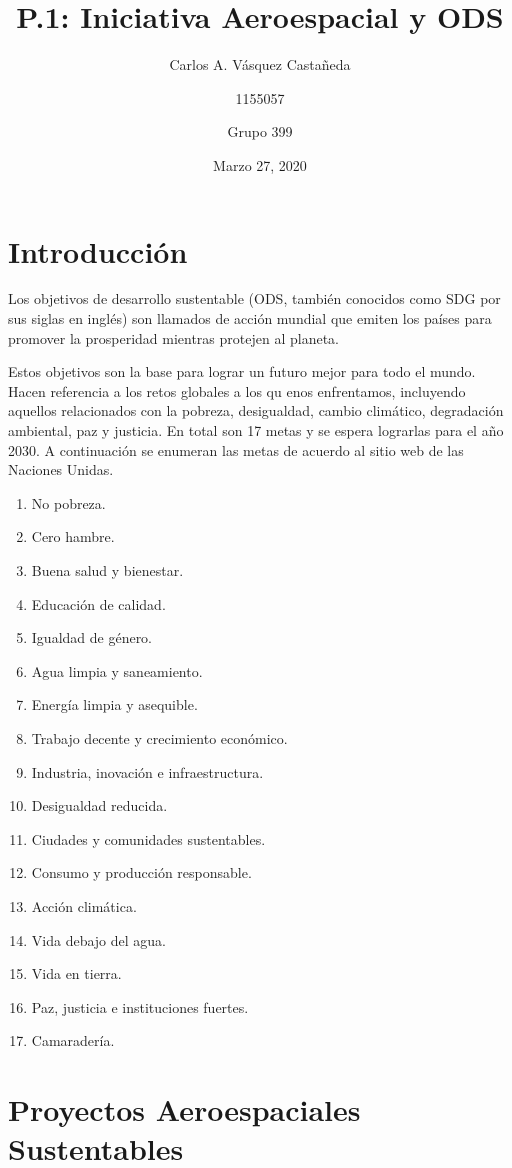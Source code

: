 \documentclass[12pt, letterpaper]{article}
\title{P.1: Iniciativa Aeroespacial y ODS}
\author{Carlos A. Vásquez Castañeda \and 1155057 \and Grupo 399}
\date{Marzo 27, 2020}
\begin{document}
\maketitle
\section*{Introducción}

Los objetivos de desarrollo sustentable (ODS, también conocidos como SDG por sus siglas en inglés) son llamados de acción mundial que emiten los países para promover la prosperidad mientras protejen al planeta. \parencite{un2020}

Estos objetivos son la base para lograr un futuro mejor para todo el mundo. Hacen referencia a los retos globales a los qu enos enfrentamos, incluyendo aquellos relacionados con la pobreza, desigualdad, cambio climático, degradación ambiental, paz y justicia. En total son 17 metas y se espera lograrlas para el año 2030. A continuación se enumeran las metas de acuerdo al sitio web de las Naciones Unidas.

\begin{enumerate}
	\item No pobreza.
	\item Cero hambre.
	\item Buena salud y bienestar.
	\item Educación de calidad.
	\item Igualdad de género.
	\item Agua limpia y saneamiento.
	\item Energía limpia y asequible.
	\item Trabajo decente y crecimiento económico.
	\item Industria, inovación e infraestructura.
	\item Desigualdad reducida.
	\item Ciudades y comunidades sustentables.
	\item Consumo y producción responsable.
	\item Acción climática.
	\item Vida debajo del agua.
	\item Vida en tierra.
	\item Paz, justicia e instituciones fuertes.
	\item Camaradería.
\end{enumerate}

\section*{Proyectos Aeroespaciales Sustentables}
\end{document}
